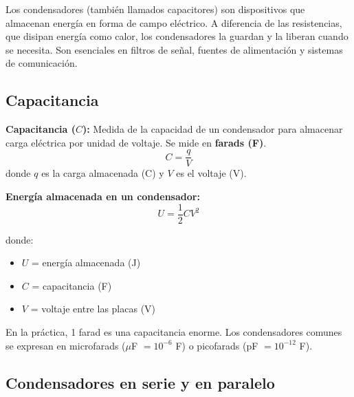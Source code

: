 \begin{seccion}
Los condensadores (también llamados capacitores) son dispositivos que almacenan energía en forma de campo eléctrico. A diferencia de las resistencias, que disipan energía como calor, los condensadores la guardan y la liberan cuando se necesita. Son esenciales en filtros de señal, fuentes de alimentación y sistemas de comunicación.
\end{seccion}

\subsection{Capacitancia}

\begin{seccion}
\begin{definicion}
\textbf{Capacitancia ($C$):} Medida de la capacidad de un condensador para almacenar carga eléctrica por unidad de voltaje. Se mide en \textbf{farads (F)}.
$$C = \frac{q}{V}$$
donde $q$ es la carga almacenada (C) y $V$ es el voltaje (V).
\end{definicion}

\begin{ecuacion}
\textbf{Energía almacenada en un condensador:}
$$U = \frac{1}{2} C V^2$$

donde:
\begin{itemize}
    \item $U$ = energía almacenada (J)
    \item $C$ = capacitancia (F)
    \item $V$ = voltaje entre las placas (V)
\end{itemize}
\end{ecuacion}

\begin{nota}
En la práctica, 1 farad es una capacitancia enorme. Los condensadores comunes se expresan en microfarads ($\mu$F $= 10^{-6}$ F) o picofarads (pF $= 10^{-12}$ F).
\end{nota}
\end{seccion}

\subsection{Condensadores en serie y en paralelo}

